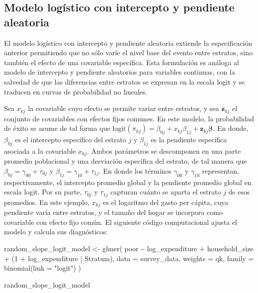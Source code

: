 \documentclass[
  spanish,
  11pt,
  letterpaper,
  oneside,
  open=any]{scrbook}
\newenvironment{Shaded}{\begin{snugshade}}{\end{snugshade}}
\newcommand{\AttributeTok}[1]{\textcolor[rgb]{0.40,0.45,0.13}{#1}}
\newcommand{\DecValTok}[1]{\textcolor[rgb]{0.68,0.00,0.00}{#1}}
\newcommand{\FunctionTok}[1]{\textcolor[rgb]{0.28,0.35,0.67}{#1}}
\newcommand{\NormalTok}[1]{\textcolor[rgb]{0.00,0.23,0.31}{#1}}
\newcommand{\OtherTok}[1]{\textcolor[rgb]{0.00,0.23,0.31}{#1}}
\newcommand{\SpecialCharTok}[1]{\textcolor[rgb]{0.37,0.37,0.37}{#1}}
\newcommand{\StringTok}[1]{\textcolor[rgb]{0.13,0.47,0.30}{#1}}
\begin{document}
\subsection{Modelo logístico con intercepto y pendiente
aleatoria}\label{modelo-logistico-con-intercepto-y-pendiente-aleatoria}

El modelo logístico con intercepto y pendiente aleatoria extiende la
especificación anterior permitiendo que no sólo varíe el nivel base del
evento entre estratos, sino también el efecto de una covariable
específica. Esta formulación es análoga al modelo de intercepto y
pendiente aleatorios para variables continuas, con la salvedad de que
las diferencias entre estratos se expresan en la escala logit y se
traducen en curvas de probabilidad no lineales.

Sea \(x_{kj}\) la covariable cuyo efecto se permite variar entre
estratos, y sea \(\mathbf{z}_{kj}\) el conjunto de covariables con
efectos fijos comunes. En este modelo, la probabilidad de éxito se asume
de tal forma que
\(\text{logit}(\pi_{kj}) = \beta_{0j} + x_{kj}\beta_{1j} + \mathbf{z}_{kj}\boldsymbol{\beta}\).
En donde, \(\beta_{0j}\) es el intercepto específico del estrato \(j\) y
\(\beta_{1j}\) es la pendiente específica asociada a la covariable
\(x_{kj}\). Ambos parámetros se descomponen en una parte promedio
poblacional y una desviación específica del estrato, de tal manera que
\(\beta_{0j} = \gamma_{00} + \tau_{0j}\) y
\(\beta_{1j} = \gamma_{10} + \tau_{1j}\). En donde los términos
\(\gamma_{00}\) y \(\gamma_{10}\) representan, respectivamente, el
intercepto promedio global y la pendiente promedio global en escala
logit. Por su parte, \(\tau_{0j}\) y \(\tau_{1j}\) capturan cuánto se
aparta el estrato \(j\) de esos promedios. En este ejemplo, \(x_{kj}\)
es el logaritmo del gasto per cápita, cuya pendiente varía entre
estratos, y el tamaño del hogar se incorpora como covariable con efecto
fijo común. El siguiente código computacional ajusta el modelo y calcula
sus diagnósticos:

\begin{Shaded}
\begin{Highlighting}[]
\NormalTok{random\_slope\_logit\_model }\OtherTok{\textless{}{-}} \FunctionTok{glmer}\NormalTok{(}
\NormalTok{  poor }\SpecialCharTok{\textasciitilde{}}\NormalTok{ log\_expenditure }\SpecialCharTok{+}\NormalTok{ household\_size }\SpecialCharTok{+}\NormalTok{ (}\DecValTok{1} \SpecialCharTok{+}\NormalTok{ log\_expenditure }\SpecialCharTok{|}\NormalTok{ Stratum),}
  \AttributeTok{data =}\NormalTok{ survey\_data,}
  \AttributeTok{weights =}\NormalTok{ qk,}
  \AttributeTok{family =} \FunctionTok{binomial}\NormalTok{(}\AttributeTok{link =} \StringTok{"logit"}\NormalTok{)}
\NormalTok{)}

\NormalTok{random\_slope\_logit\_model}
\end{Highlighting}
\end{Shaded}
\end{document}
